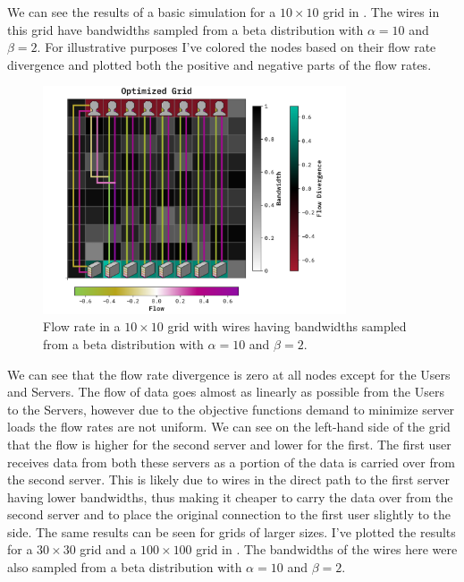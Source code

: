 \documentclass[10pt, titlepage, a4paper]{article}
\begin{document}
We can see the results of a basic simulation for a $10\times 10$ grid in \textcolor{red}{}. The wires 
in this grid have bandwidths sampled from a beta distribution with $\alpha = 10$ and $\beta = 2$. For illustrative purposes
I've colored the nodes based on their flow rate divergence and plotted both the positive and negative parts of the 
flow rates.

\begin{figure}[H]
    \centering
    \includegraphics[width=0.8\textwidth]{../Images/optimize-case-10.pdf}
    \caption{Flow rate in a $10\times 10$ grid with wires having bandwidths sampled from a beta distribution with $\alpha = 10$ and $\beta = 2$.}
    \label{fig:basic_grid}
\end{figure}

We can see that the flow rate divergence is zero at all nodes except for the Users and Servers. The flow of data goes almost 
as linearly as possible from the Users to the Servers, however due to the objective functions demand to minimize server loads 
the flow rates are not uniform. We can see on the left-hand side of the grid that the flow is higher for the second server and lower 
for the first. The first user receives data from both these servers as a portion of the data is carried over from the second 
server. This is likely due to wires in the direct path to the first server having lower bandwidths, thus making it cheaper 
to carry the data over from the second server and to place the original connection to the first user slightly to the side. 
The same results can be seen for grids of larger sizes. I've plotted the results for a $30\times 30$ grid and 
a $100\times 100$ grid in \textcolor{red}{}. The bandwidths of the wires here were also sampled from a beta distribution
with $\alpha = 10$ and $\beta = 2$.
\end{document}

